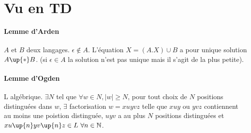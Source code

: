 \documentclass[french]{article}
\begin{document}
\section{Vu en TD}
\paragraph{Lemme d'Arden}
$A$ et $B$ deux langages. $\epsilon \not\in A$. L'équation $X = (A.X)\cup B$ a pour unique solution $A\up{*}B$. (si $\epsilon \in A$ la solution n'est pas unique mais il s'agit de la plus petite).

\paragraph{Lemme d'Ogden}
L algébrique. $\exists N$ tel que $\forall w\in N, |w|\geq N$, pour tout choix de $N$ positions distinguées dans $w$, $\exists$ factorisation $w=xuyvz$ telle que $xuy$ ou $yvz$ contiennent au moins une poistion distinguée, $uyv$ a au plus $N$ positions distinguées et $xu\up{n}yv\up{n}z\in L\ \forall n\in\mathbb{N}$.
\end{document}

